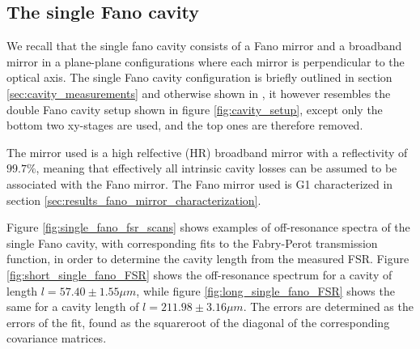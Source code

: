 \clearpage
\subsection{The single Fano cavity}\label{sec:the_single_fano_cavity_results}

We recall that the single fano cavity consists of a Fano mirror and a broadband mirror in a plane-plane configurations where each mirror is perpendicular to the optical axis. The single Fano cavity configuration is briefly outlined in section \ref{sec:cavity_measurements} and otherwise shown in \cite{Mitra}, it however resembles the double Fano cavity setup shown in figure \ref{fig:cavity_setup}, except only the bottom two xy-stages are used, and the top ones are therefore removed.   

The mirror used is a high relfective (HR) broadband mirror with a reflectivity of $99.7\%$, meaning that effectively all intrinsic cavity losses can be assumed to be associated with the Fano mirror. The Fano mirror used is G1 characterized in section \ref{sec:results_fano_mirror_characterization}. 

Figure \ref{fig:single_fano_fsr_scans} shows examples of off-resonance spectra of the single Fano cavity, with corresponding fits to the Fabry-Perot transmission function, in order to determine the cavity length from the measured FSR. Figure \ref{fig:short_single_fano_FSR} shows the off-resonance spectrum for a cavity of length $l = 57.40 \pm 1.55 \mu m$, while figure \ref{fig:long_single_fano_FSR} shows the same for a cavity length of $l = 211.98 \pm 3.16 \mu m$. The errors are determined as the errors of the fit, found as the squareroot of the diagonal of the corresponding covariance matrices.

